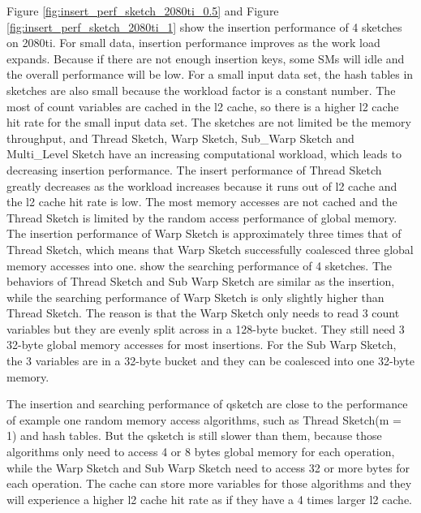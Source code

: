 \documentclass[conference]{IEEEtran}
\begin{document}
Figure \ref{fig:insert_perf_sketch_2080ti_0.5} and Figure \ref{fig:insert_perf_sketch_2080ti_1} show the insertion performance of 4 sketches on 2080ti. For small data, insertion performance improves as the work load expands. Because if there are not enough insertion keys, some SMs will idle and the overall performance will be low. For a small input data set, the hash tables in sketches are also small because the workload factor is a constant number. The most of count variables are cached in the l2 cache, so there is a higher l2 cache hit rate for the small input data set. The sketches are not limited be the memory throughput, and Thread Sketch, Warp Sketch, Sub\_Warp Sketch and Multi\_Level Sketch have an increasing computational workload, which leads to decreasing insertion performance. The insert performance of Thread Sketch greatly decreases as the workload increases because it runs out of l2 cache and the l2 cache hit rate is low. The most memory accesses are not cached and the Thread Sketch is limited by the random access performance of global memory. The insertion performance of Warp Sketch is approximately three times that of Thread Sketch, which means that Warp Sketch successfully coalesced three global memory accesses into one. 
show the searching performance of 4 sketches. The behaviors of Thread Sketch and Sub Warp Sketch are similar as the insertion, while the searching performance of Warp Sketch is only slightly higher than Thread Sketch. The reason is that the Warp Sketch only needs to read 3 count variables but they are evenly split across in a 128-byte bucket. They still need 3 32-byte global memory accesses for most insertions. For the Sub Warp Sketch, the 3 variables are in a 32-byte bucket and they can be coalesced into one 32-byte memory. 


% 
% 
% 
% 

The insertion and searching performance of qsketch are close to the performance of example one random memory access algorithms, such as Thread Sketch(m = 1) and hash tables. But the qsketch is still slower than them, because those algorithms only need to access 4 or 8 bytes global memory for each operation, while the Warp Sketch and Sub Warp Sketch need to access 32 or more bytes for each operation. The cache can store more variables for those algorithms and they will experience a higher l2 cache hit rate as if they have a 4 times larger l2 cache.
% 
% 
% 
% 
\end{document}
